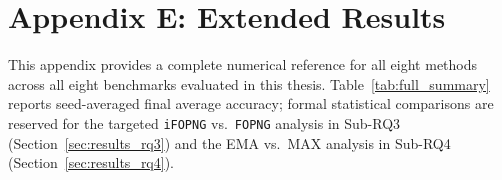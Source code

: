 
\section*{Appendix E: Extended Results}
\label{app:full_comparison}

This appendix provides a complete numerical reference for all eight methods
across all eight benchmarks evaluated in this thesis.
Table~\ref{tab:full_summary} reports seed-averaged final average accuracy;
formal statistical comparisons are reserved for the targeted
\texttt{iFOPNG} vs.\ \texttt{FOPNG} analysis in Sub-RQ3
(Section~\ref{sec:results_rq3}) and the EMA vs.\ MAX analysis in
Sub-RQ4 (Section~\ref{sec:results_rq4}).


